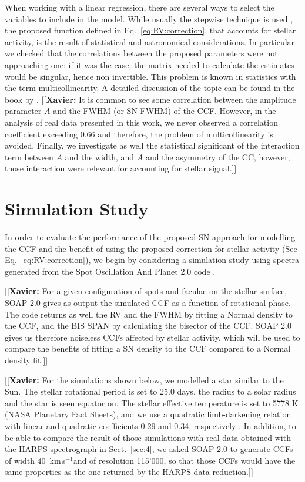 \documentclass[11pt, oneside]{article}
\def\kms{\hbox{\,km\,s$^{-1}$}}       %
\newcommand{\xavier}[1]{{\color{blue}[[\textbf{Xavier: }#1]]}}
\begin{document}
When working with a linear regression, there are several ways to select the variables to include in the model. While usually the stepwise technique is used \citep{efroymson1960multiple,hocking1976biometrics}, the proposed function defined in Eq.~\ref{eq:RV:correction}, that accounts for stellar activity, is the result of statistical and astronomical considerations. In particular we checked that the correlations between the proposed parameters were not approaching one: if it was the case, the matrix needed to calculate the estimates would be singular, hence non invertible. This problem is known in statistics with the term multicollinearity. A detailed discussion of the topic can be found in the book by \citet{belsley1991}. \xavier{It is common to see some correlation between the amplitude parameter $A$ and the FWHM (or SN FWHM) of the CCF. However, in the analysis of real data presented in this work, we never observed a correlation coefficient exceeding $0.66$ and therefore, the problem of multicollinearity is avoided. Finally, we investigate as well the statistical significant of the interaction term between $A$ and the width, and $A$ and the asymmetry of the CC, however, those interaction were relevant for accounting for stellar signal.}

\section{Simulation Study} \label{sec:soap}
In order to evaluate the performance of the proposed SN approach for modelling the CCF and the benefit of using the proposed correction for stellar activity (See Eq.~\ref{eq:RV:correction}), we begin by considering a simulation study using spectra generated from the Spot Oscillation And Planet 2.0 code \citep[SOAP 2.0,][]{Dumusque-2014b}.

\xavier{For a given configuration of spots and faculae on the stellar surface, SOAP 2.0 gives as output the simulated CCF as a function of rotational phase. The code returns as well the RV and the FWHM by fitting a Normal density to the CCF, and the BIS SPAN by calculating the bisector of the CCF. SOAP 2.0 gives us therefore noiseless CCFs affected by stellar activity, which will be used to compare the benefits of fitting a SN density to the CCF compared to a Normal density fit.}

\xavier{For the simulations shown below, we modelled a star similar to the Sun. The stellar rotational period is set to 25.0 days, the radius to a solar radius and the star is seen equator on. The stellar effective temperature is set to 5778 K (NASA Planetary Fact Sheets), and we use a quadratic limb-darkening relation with linear and quadratic coefficients 0.29 and 0.34, respectively \citep[][]{Oshagh-2013a, Claret-2011}. In addition, to be able to compare the result of those simulations with real data obtained with the HARPS spectrograph in Sect.~\ref{sec:4}, we asked SOAP 2.0 to generate CCFs of width 40 \kms and of resolution 115'000, so that those CCFs would have the same properties as the one returned by the HARPS data reduction.}
\end{document}
